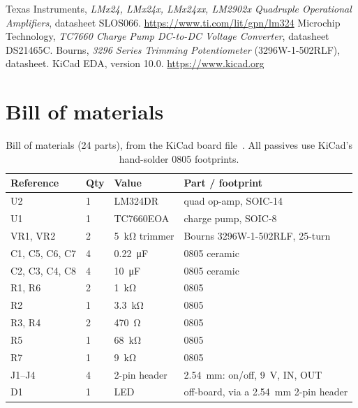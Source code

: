 \documentclass[10pt,letterpaper]{article}
\renewcommand{\arraystretch}{1.15}
\begin{document}
\FloatBarrier
\begin{thebibliography}{9}\small
{} Texas Instruments, \emph{LMx24, LMx24x, LMx24xx, LM2902x Quadruple Operational Amplifiers}, datasheet SLOS066. \url{https://www.ti.com/lit/gpn/lm324}
 Microchip Technology, \emph{TC7660 Charge Pump DC-to-DC Voltage Converter}, datasheet DS21465C.
 Bourns, \emph{3296 Series Trimming Potentiometer} (3296W-1-502RLF), datasheet.
 KiCad EDA, version 10.0. \url{https://www.kicad.org}
\end{thebibliography}

\clearpage
\appendix
\section{Bill of materials}
\begin{table}[!h]
  \centering\footnotesize\renewcommand{\arraystretch}{1.05}
  \begin{tabular}{C{2.6cm}C{0.8cm}C{2.2cm}C{4.6cm}}
    \toprule
    \textbf{Reference} & \textbf{Qty} & \textbf{Value} & \textbf{Part / footprint} \\
    \midrule
    U2 & 1 & LM324DR & quad op-amp, SOIC-14 \\
    U1 & 1 & TC7660EOA & charge pump, SOIC-8 \\
    VR1, VR2 & 2 & \SI{5}{\kilo\ohm} trimmer & Bourns 3296W-1-502RLF, 25-turn~\cite{bourns} \\
    C1, C5, C6, C7 & 4 & \SI{0.22}{\micro\farad} & 0805 ceramic \\
    C2, C3, C4, C8 & 4 & \SI{10}{\micro\farad} & 0805 ceramic \\
    R1, R6 & 2 & \SI{1}{\kilo\ohm} & 0805 \\
    R2 & 1 & \SI{3.3}{\kilo\ohm} & 0805 \\
    R3, R4 & 2 & \SI{470}{\ohm} & 0805 \\
    R5 & 1 & \SI{68}{\kilo\ohm} & 0805 \\
    R7 & 1 & \SI{9}{\kilo\ohm} & 0805 \\
    J1--J4 & 4 & 2-pin header & \SI{2.54}{\milli\metre}: on/off, \SI{9}{\volt}, IN, OUT \\
    D1 & 1 & LED & off-board, via a \SI{2.54}{\milli\metre} 2-pin header \\
    \bottomrule
  \end{tabular}
  \caption{Bill of materials (24 parts), from the KiCad board file~\cite{kicad}. All passives use KiCad's hand-solder 0805 footprints.}
  \label{tab:bom}
\end{table}
\end{document}
